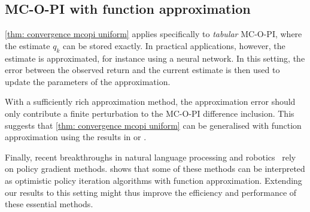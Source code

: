 \subsection{MC-O-PI with function approximation}
\label{sec: discussion function approximation}

\autoref{thm: convergence mcopi uniform} applies specifically to \textit{tabular} MC-O-PI, where the estimate $q_k$ can be stored exactly.
In practical applications, however, the estimate is approximated, for instance using a neural network.
In this setting, the error between the observed return and the current estimate is then used to update the parameters of the approximation.


With a sufficiently rich approximation method,
the approximation error should only contribute a finite perturbation to the MC-O-PI difference inclusion.
This suggests that \autoref{thm: convergence mcopi uniform}
can be generalised with function approximation using the results in \citep[Section~4.3.3]{Bertsekas1996Neuro-DynamicProgramming} or \citep[Section~5.2]{Kushner2003StochasticApplications}.








Finally, recent breakthroughs in natural language processing and robotics~\citep{Schulman2017ProximalAlgorithms} rely on policy gradient methods.
\citet{Wagner2013OptimisticResult} shows that some of these methods can be interpreted as optimistic policy iteration algorithms with function approximation.
Extending our results to this setting might thus improve the efficiency and performance of these essential methods.























































